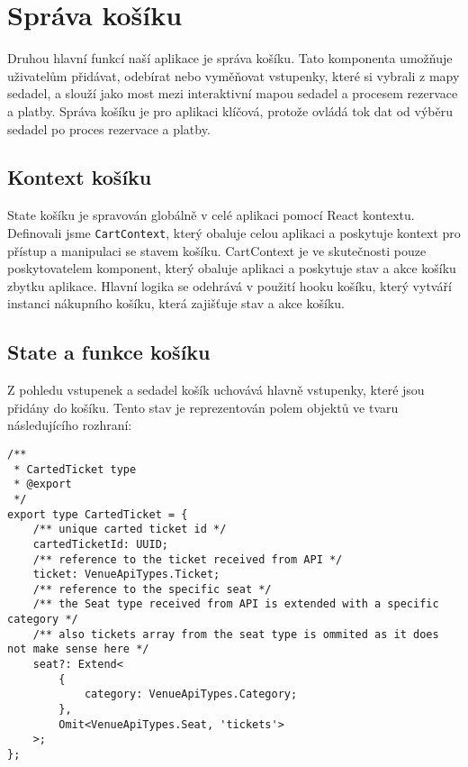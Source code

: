 \section{Správa košíku}
\label{sec:implementace-kosik}
Druhou hlavní funkcí naší aplikace je správa košíku.
Tato komponenta umožňuje uživatelům přidávat, odebírat nebo vyměňovat vstupenky, které si vybrali z mapy sedadel, a slouží jako most mezi interaktivní mapou sedadel a procesem rezervace a platby.
Správa košíku je pro aplikaci klíčová, protože ovládá tok dat od výběru sedadel po proces rezervace a platby.

\subsection{Kontext košíku}
\label{subsec:implementace-kosik-kontext}
State košíku je spravován globálně v celé aplikaci pomocí React kontextu.
Definovali jsme \texttt{CartContext}, který obaluje celou aplikaci a poskytuje kontext pro přístup a manipulaci se stavem košíku.
CartContext je ve skutečnosti pouze poskytovatelem komponent, který obaluje aplikaci a poskytuje stav a akce košíku zbytku aplikace.
Hlavní logika se odehrává v použití hooku košíku, který vytváří instanci nákupního košíku, která zajišťuje stav a akce košíku.

\subsection{State a funkce košíku}
\label{subsec:implementace-kosik-state}
Z pohledu vstupenek a sedadel košík uchovává hlavně vstupenky, které jsou přidány do košíku.
Tento stav je reprezentován polem objektů ve tvaru následujícího rozhraní:

\begin{verbatim}
/**
 * CartedTicket type
 * @export
 */
export type CartedTicket = {
	/** unique carted ticket id */
	cartedTicketId: UUID;
	/** reference to the ticket received from API */
	ticket: VenueApiTypes.Ticket;
	/** reference to the specific seat */
	/** the Seat type received from API is extended with a specific category */
	/** also tickets array from the seat type is ommited as it does not make sense here */
	seat?: Extend<
		{
			category: VenueApiTypes.Category;
		},
		Omit<VenueApiTypes.Seat, 'tickets'>
	>;
};
\end{verbatim}

